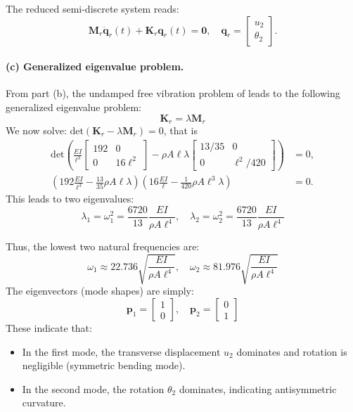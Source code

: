 \documentclass[12pt]{article}
\begin{document}
The reduced semi-discrete system reads:
\[
	\mathbf{M}_r \ddot{\mathbf{q}}_r(t) + \mathbf{K}_r \mathbf{q}_r(t) = \mathbf 0, \quad \mathbf{q}_r = \begin{bmatrix} u_2 \\ \theta_2 \end{bmatrix}.
\]

\paragraph*{(c) Generalized eigenvalue problem.} From part (b), the undamped free vibration problem of leads to the following generalized eigenvalue problem:
\[
	\mathbf{K}_r  = \lambda \mathbf{M}_r
\]
We now solve: $\text{det}\left(\mathbf{K}_r  - \lambda \mathbf{M}_r\right)=0$, that is
\begin{align*}
	\text{det}\left(\frac{EI}{\ell^3}\begin{bmatrix} 192 & 0 \\ 0 & 16\ell^2
	                                 \end{bmatrix}-\rho A\ell \lambda\begin{bmatrix} 13/35 & 0 \\ 0 & \ell^2/420
	                                                                 \end{bmatrix}\right)                                                        & =0, \\
	\left(192\frac{EI}{\ell^3}-\frac{13}{35}\rho A\ell\lambda \right)\left(16\frac{EI}{\ell}-\frac{1}{420}\rho A\ell^3\lambda  \right) & = 0.
\end{align*}
This leads to two eigenvalues:
\[
	\lambda_1 = \omega_1^2 = \frac{6720}{13} \frac{EI}{\rho A\ell^4}, \quad
	\lambda_2 = \omega_2^2 =  \frac{6720}{13} \frac{EI}{\rho A\ell^4}
\]

Thus, the lowest two natural frequencies are:
\[
	\omega_1 \approx 22.736 \sqrt{\frac{EI}{\rho A\ell^4}}, \quad
	\omega_2  \approx 81.976 \sqrt{\frac{EI}{\rho A\ell^4}}
\]
The eigenvectors (mode shapes) are simply:
\[
	\mathbf p_1 = \begin{bmatrix} 1 \\ 0 \end{bmatrix}, \quad
	\mathbf p_2 = \begin{bmatrix} 0 \\ 1 \end{bmatrix}
\]
These indicate that:
\begin{itemize}
	\item In the first mode, the transverse displacement \( u_2 \) dominates and rotation is negligible (symmetric bending mode).
	\item In the second mode, the rotation \( \theta_2 \) dominates, indicating antisymmetric curvature.
\end{itemize}
\end{document}

